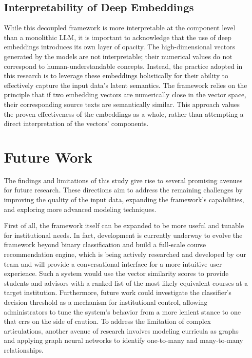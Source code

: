 \subsection{Interpretability of Deep Embeddings}\label{ch:5.2.5}
While this decoupled framework is more interpretable at the component level than a monolithic LLM, it is important to acknowledge that the use of deep embeddings introduces its own layer of opacity.  The high-dimensional vectors generated by the models are not interpretable; their numerical values do not correspond to human-understandable concepts.  Instead, the practice adopted in this research is to leverage these embeddings holistically for their ability to effectively capture the input data's latent semantics. The framework relies on the principle that if two embedding vectors are numerically close in the vector space, their corresponding source texts are semantically similar. This approach values the proven effectiveness of the embeddings as a whole, rather than attempting a direct interpretation of the vectors' components.

\section{Future Work}\label{ch:5.3}
The findings and limitations of this study give rise to several promising avenues for future research. These directions aim to address the remaining challenges by improving the quality of the input data, expanding the framework's capabilities, and exploring more advanced modeling techniques.

First of all, the framework itself can be expanded to be more useful and tunable for institutional needs. In fact, development is currently underway to evolve the framework beyond binary classification and build a full-scale course recommendation engine, which is being actively researched and developed by our team and will provide a conversational interface for a more intuitive user experience. Such a system would use the vector similarity scores to provide students and advisors with a ranked list of the most likely equivalent courses at a target institution. Furthermore, future work could investigate the classifier's decision threshold as a mechanism for institutional control, allowing administrators to tune the system's behavior from a more lenient stance to one that errs on the side of caution. To address the limitation of complex articulations, another avenue of research involves modeling curricula as graphs and applying graph neural networks to identify one-to-many and many-to-many relationships.

